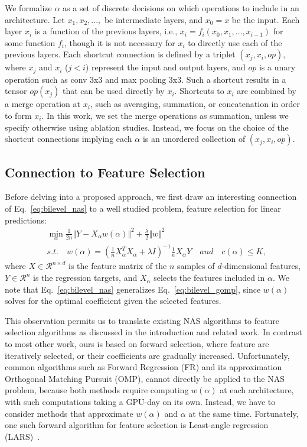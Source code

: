 We formalize $\alpha$ as a set of discrete decisions on which operations to include in an architecture.
Let $x_1, x_2,...,$ be intermediate layers, and $x_0 = x$ be the input. Each layer $x_i$ is a function
of the previous layers, i.e., $x_{i} = f_i ( x_0, x_1,..., x_{i-1})$ for some function $f_i$, 
though it is not necessary for $x_i$ to directly use each of the previous layers.
Each shortcut connection is defined by a triplet $(x_{j}, x_{i}, op)$, 
where $x_j$ and $x_i$ ($j < i$) represent the input and output layers, and $op$ is a unary operation such 
as conv 3x3 and max pooling 3x3. Such a shortcut results in a tensor $op(x_{j})$ that can be used directly by 
$x_i$. Shortcuts to $x_i$ are combined by a merge operation 
at $x_i$, such as averaging, summation, or concatenation in order to form $x_i$.
In this work, we set the merge operations as summation, unless we specify otherwise using ablation studies. Instead, we focus on the choice of the shortcut connections implying each $\alpha$ is an unordered collection of $(x_j, x_i, op)$.  

\subsection{Connection to Feature Selection}

Before delving into a proposed approach, we first draw an interesting connection of Eq.~\ref{eq:bilevel_nas}
to a well studied problem, feature selection for linear predictions:
\begin{align}
&\min _{\alpha} \frac{1}{2n} \Vert Y - X_{\alpha} w(\alpha) \Vert ^2 + \frac{\lambda}{2} \Vert w \Vert ^2 \\
&s.t. \quad w(\alpha) = (\frac{1}{n}X_{\alpha}^TX_{\alpha} + \lambda I)^{-1} \frac{1}{n} X_{\alpha}Y 
\quad and \quad c(\alpha) \leq K,
\label{eq:bilevel_gomp}
\end{align}
where $X \in \mathcal{R}^{n \times d}$ is the feature matrix of the $n$ samples of $d$-dimensional features,
$Y \in \mathcal{R}^n$ is the regression targets, and $X_{\alpha}$ selects the features included in $\alpha$.
We note that Eq.~\ref{eq:bilevel_nas} generalizes Eq.~\ref{eq:bilevel_gomp}, since $w(\alpha)$ solves for the 
optimal coefficient given the selected features.

This observation permits us to translate existing NAS algorithms to
feature selection algorithms as discussed in the introduction and
related work.  In contrast to most other work, ours is based on
forward selection, where feature are iteratively selected, or their
coefficients are gradually increased.  Unfortunately, common
algorithms such as Forward Regression (FR) and its approximation
Orthogonal Matching Pursuit (OMP), cannot directly be applied to the
NAS problem, because both methods require computing $w(\alpha)$ at
each architecture, with such computations taking a GPU-day on its
own. Instead, we have to consider methods that approximate $w(\alpha)$
and $\alpha$ at the same time. Fortunately, one such forward algorithm
for feature selection is Least-angle regression (LARS)~\citep{lars}.

